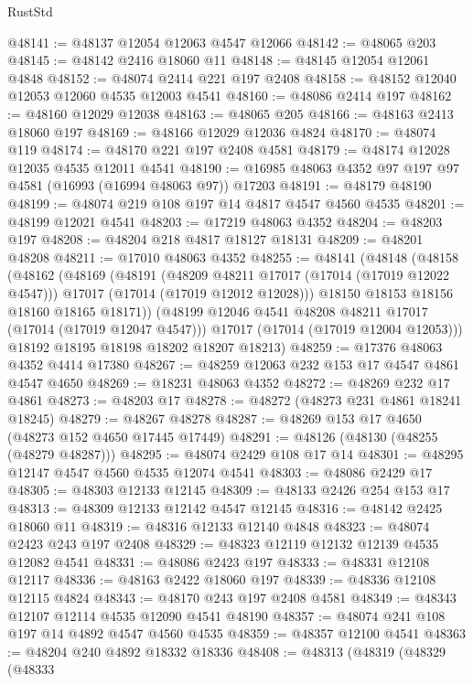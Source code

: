 \begin{lexlean}{RustStd}
\begin{coremodule}
@48141 := @48137 @12054 @12063 @4547 @12066
@48142 := @48065 @203
@48145 := @48142 @2416 @18060 @11
@48148 := @48145 @12054 @12061 @4848
@48152 := @48074 @2414 @221 @197 @2408
@48158 := @48152 @12040 @12053 @12060 @4535 @12003 @4541
@48160 := @48086 @2414 @197
@48162 := @48160 @12029 @12038
@48163 := @48065 @205
@48166 := @48163 @2413 @18060 @197
@48169 := @48166 @12029 @12036 @4824
@48170 := @48074 @119
@48174 := @48170 @221 @197 @2408 @4581
@48179 := @48174 @12028 @12035 @4535 @12011 @4541
@48190 := @16985 @48063 @4352 @97 @197 @97 @4581 (@16993 (@16994 @48063 @97)) @17203
@48191 := @48179 @48190
@48199 := @48074 @219 @108 @197 @14 @4817 @4547 @4560 @4535
@48201 := @48199 @12021 @4541
@48203 := @17219 @48063 @4352
@48204 := @48203 @197
@48208 := @48204 @218 @4817 @18127 @18131
@48209 := @48201 @48208
@48211 := @17010 @48063 @4352
@48255 := @48141
    (@48148
      (@48158
        (@48162
          (@48169
            (@48191
              (@48209 @48211 @17017 (@17014 (@17019 @12022 @4547)))
              @17017
              (@17014 (@17019 @12012 @12028)))
            @18150
            @18153
            @18156
            @18160
            @18165
            @18171))
        (@48199 @12046 @4541 @48208 @48211 @17017 (@17014 (@17019 @12047 @4547)))
        @17017
        (@17014 (@17019 @12004 @12053)))
      @18192
      @18195
      @18198
      @18202
      @18207
      @18213)
@48259 := @17376 @48063 @4352 @4414 @17380
@48267 := @48259 @12063 @232 @153 @17 @4547 @4861 @4547 @4650
@48269 := @18231 @48063 @4352
@48272 := @48269 @232 @17 @4861
@48273 := @48203 @17
@48278 := @48272 (@48273 @231 @4861 @18241 @18245)
@48279 := @48267 @48278
@48287 := @48269 @153 @17 @4650 (@48273 @152 @4650 @17445 @17449)
@48291 := @48126 (@48130 (@48255 (@48279 @48287)))
@48295 := @48074 @2429 @108 @17 @14
@48301 := @48295 @12147 @4547 @4560 @4535 @12074 @4541
@48303 := @48086 @2429 @17
@48305 := @48303 @12133 @12145
@48309 := @48133 @2426 @254 @153 @17
@48313 := @48309 @12133 @12142 @4547 @12145
@48316 := @48142 @2425 @18060 @11
@48319 := @48316 @12133 @12140 @4848
@48323 := @48074 @2423 @243 @197 @2408
@48329 := @48323 @12119 @12132 @12139 @4535 @12082 @4541
@48331 := @48086 @2423 @197
@48333 := @48331 @12108 @12117
@48336 := @48163 @2422 @18060 @197
@48339 := @48336 @12108 @12115 @4824
@48343 := @48170 @243 @197 @2408 @4581
@48349 := @48343 @12107 @12114 @4535 @12090 @4541 @48190
@48357 := @48074 @241 @108 @197 @14 @4892 @4547 @4560 @4535
@48359 := @48357 @12100 @4541
@48363 := @48204 @240 @4892 @18332 @18336
@48408 := @48313
    (@48319
      (@48329
        (@48333

\end{coremodule}
\end{lexlean}
